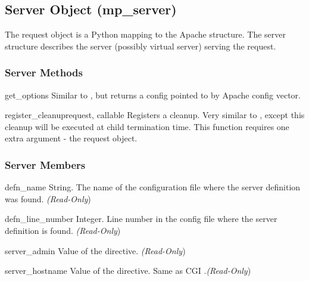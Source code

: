 \subsection{Server Object (mp_server)\label{pyapi-mpserver}}

The request object is a Python mapping to the Apache 
structure. The server structure describes the server (possibly virtual
server) serving the request.

\subsubsection{Server Methods\label{pyapi-mpsrv-meth}}

\begin{methoddesc}[server]{get_options}{}
Similar to , but returns a config pointed to
by  Apache config vector. 
\end{methoddesc}

\begin{methoddesc}[server]{register_cleanup}{request, callable}
Registers a cleanup. Very similar to , except
this cleanup will be executed at child termination time. This function
requires one extra argument - the request object.
\end{methoddesc}

\subsubsection{Server Members\label{pyapi-mpsrv-mem}}

\begin{memberdesc}[server]{defn_name}
String. The name of the configuration file where the server definition
was found.
\emph{(Read-Only})
\end{memberdesc}

\begin{memberdesc}[server]{defn_line_number}
Integer. Line number in the config file where the server definition is
found.
\emph{(Read-Only})
\end{memberdesc}

\begin{memberdesc}[server]{server_admin}
Value of the  directive. 
\emph{(Read-Only})
\end{memberdesc}

\begin{memberdesc}[server]{server_hostname}
Value of the  directive. Same as CGI .\emph{(Read-Only})
\end{memberdesc}

